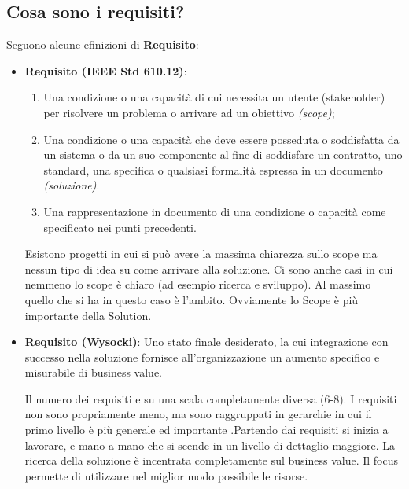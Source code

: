 \subsection{Cosa sono i requisiti?}
Seguono alcune efinizioni di \textbf{Requisito}:
\begin{itemize}
	\item \textbf{Requisito (IEEE Std 610.12)}: 
	\begin{enumerate}
		\item Una condizione o una capacità di cui necessita un utente (stakeholder) per risolvere un problema o arrivare ad un obiettivo \textit{(scope)};
		\item Una condizione o una capacità che deve essere posseduta o soddisfatta da un sistema o da un suo componente al fine di soddisfare un contratto, uno standard, una specifica o qualsiasi formalità espressa in un documento \textit{(soluzione)}.
		\item Una rappresentazione in documento di una condizione o capacità come specificato nei punti precedenti.
	\end{enumerate}
	\begin{warn}
		Esistono progetti in cui si può avere la massima chiarezza sullo scope ma nessun tipo di idea su come arrivare alla soluzione. Ci sono anche casi in cui nemmeno lo scope è chiaro (ad esempio ricerca e sviluppo). Al massimo quello che si ha in questo caso è l'ambito. Ovviamente lo Scope è più importante della Solution.
	\end{warn}
	\item \textbf{Requisito (Wysocki)}: Uno stato finale desiderato, la cui integrazione con successo nella soluzione fornisce all'organizzazione un aumento specifico e misurabile di business value.
	\begin{info}
		Il numero dei requisiti e su una scala completamente diversa (6-8). I requisiti non sono propriamente meno, ma sono raggruppati in gerarchie in cui il primo livello è più generale ed importante .Partendo dai requisiti si inizia a lavorare, e mano a mano che si scende in un livello di dettaglio maggiore. La ricerca della soluzione è incentrata completamente sul business value. Il focus permette di utilizzare nel miglior modo possibile le risorse.
	\end{info}
\end{itemize}
